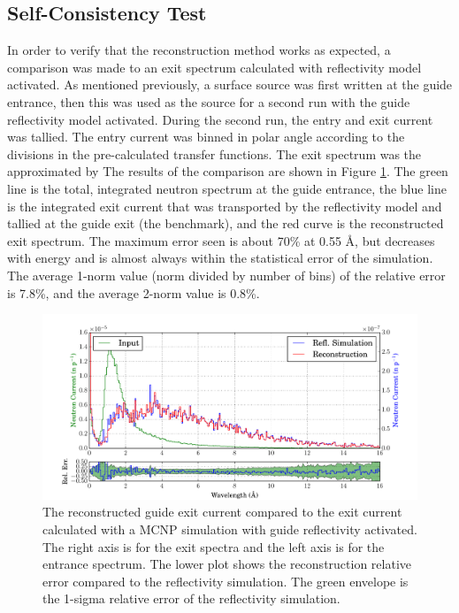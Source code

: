 \documentclass[a4paper]{jpconf}
\begin{document}
\subsection{Self-Consistency Test}

In order to verify that the reconstruction method works as expected, a comparison was made to an exit spectrum calculated with reflectivity model activated.  As mentioned previously, a surface source was first written at the guide entrance, then this was used as the source for a second run with the guide reflectivity model activated.  During the second run, the entry and exit current was tallied.  The entry current was binned in polar angle according to the divisions in the pre-calculated transfer functions.  The exit spectrum was the approximated by   The results of the comparison are shown in Figure \ref{xfer_bench}.  The green line is the total, integrated neutron spectrum at the guide entrance, the blue line is the integrated exit current that was transported by the reflectivity model and tallied at the guide exit (the benchmark), and the red curve is the reconstructed exit spectrum.  The maximum error seen is about 70\% at 0.55 \AA{}, but decreases with energy and is almost always within the statistical error of the simulation.  The average 1-norm value (norm divided by number of bins) of the relative error is 7.8\%, and the average 2-norm value is 0.8\%.

\begin{figure}
\begin{center}
\includegraphics[scale=0.5]{graphics/xfer_bench.pdf}
\end{center}
\caption{\label{xfer_bench}The reconstructed guide exit current compared to the exit current calculated with a MCNP simulation with guide reflectivity activated.  The right axis is for the exit spectra and the left axis is for the entrance spectrum.  The lower plot shows the reconstruction relative error compared to the reflectivity simulation.  The green envelope is the 1-sigma relative error of the reflectivity simulation.}
\end{figure}
\end{document}
